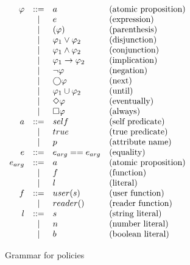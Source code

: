 \begin{table}[h!]
    \centering
    $
    \begin{array}{rcll}
      \varphi        & ::=   & a                     & \text{(atomic proposition)} \\
                  & |     & e                     & \text{(expression)} \\
                  & |     & \left( \varphi \right)   & \text{(parenthesis)} \\
                  & |     & \varphi_1 \lor \varphi_2    & \text{(disjunction)} \\
                  & |     & \varphi_1 \land \varphi_2   & \text{(conjunction)} \\
                  & |     & \varphi_1 \to \varphi_2     & \text{(implication)} \\
                  & |     & \neg \varphi             & \text{(negation)} \\
                  & |     & \bigcirc \varphi               & \text{(next)} \\
                  & |     & \varphi_1 \cup \varphi_2      & \text{(until)} \\
                  & |     & \Diamond \varphi               & \text{(eventually)} \\
                  & |     & \square \varphi               & \text{(always)} \\
      a           & ::=   & self                  & \text{(self predicate)} \\
                  & |     & true                  & \text{(true predicate)} \\
                  & |     & p                     & \text{(attribute name)} \\
      e           & ::=   & e_{arg} == e_{arg}     & \text{(equality)} \\
      e_{arg}     & ::=   & a                     & \text{(atomic proposition)} \\
                  & |     & f                     & \text{(function)} \\
                  & |     & l                     & \text{(literal)} \\
      f           & ::=   & user(s)               & \text{(user function)} \\
                  & |     & reader()              & \text{(reader function)} \\
      l           & ::=   & s                     & \text{(string literal)} \\
                  & |     & n                     & \text{(number literal)} \\
                  & |     & b                     & \text{(boolean literal)}
    \end{array}
    $
    \caption{Grammar for policies}
    \label{tab:grammar}
\end{table}